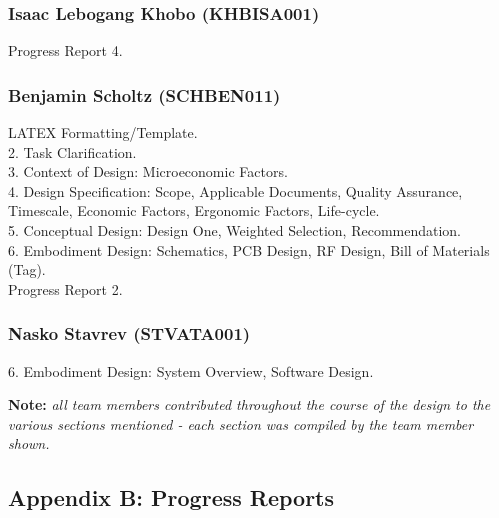 \subsubsection*{Isaac Lebogang Khobo (KHBISA001)}
Progress Report 4.
\subsubsection*{Benjamin Scholtz (SCHBEN011)}
LATEX Formatting/Template. \\
2. Task Clarification. \\
3. Context of Design: Microeconomic Factors. \\
4. Design Specification: Scope, Applicable Documents, Quality Assurance, Timescale, Economic Factors, Ergonomic Factors, Life-cycle. \\
5. Conceptual Design: Design One, Weighted Selection, Recommendation. \\
6. Embodiment Design: Schematics, PCB Design, RF Design, Bill of Materials (Tag). \\
Progress Report 2.
\subsubsection*{Nasko Stavrev (STVATA001)}
6. Embodiment Design: System Overview, Software Design.

\vfill
\textbf{Note: }\textit{all team members contributed throughout the course of the design to the various sections mentioned - each section was compiled by the team member shown.}

\newpage
\vspace*{\fill}
\begin{center}
\subsection*{Appendix B: Progress Reports}
\end{center}
\vspace*{\fill}

\newpage
